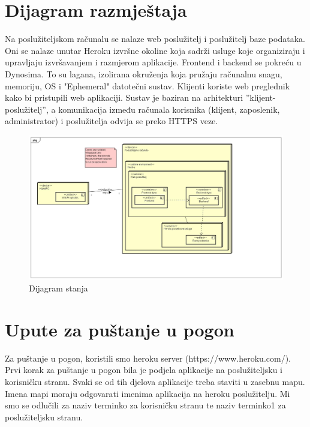 		
		\section{Dijagram razmještaja}
			Na poslužiteljskom računalu se nalaze web poslužitelj i poslužitelj baze podataka. Oni se nalaze unutar Heroku izvršne okoline koja sadrži usluge koje organiziraju i upravljaju izvršavanjem i razmjerom aplikacije. Frontend i backend se pokreću u Dynosima. To su lagana, izolirana okruženja koja pružaju računalnu snagu, memoriju, OS i "Ephemeral" datotečni sustav. Klijenti koriste web preglednik kako bi pristupili web aplikaciji.  Sustav je baziran na arhitekturi ”klijent-poslužitelj”, a komunikacija između računala korisnika (klijent, zaposlenik, administrator) i poslužitelja odvija se preko HTTPS veze.
			
			\begin{figure}[H]
				\includegraphics[width=1\linewidth]{slike/dijagram-razmjestaja.jpg}
				\centering
				\caption{Dijagram stanja}
				\label{fig:dijagram_razmjestaja}
			\end{figure}
			\eject 
		
		\section{Upute za puštanje u pogon}
		
			Za puštanje u pogon, koristili smo heroku server (https://www.heroku.com/). Prvi korak za puštanje u pogon bila je podjela aplikacije na poslužiteljsku i korisničku stranu. Svaki se od tih djelova aplikacije treba staviti u zasebnu mapu. Imena mapi moraju odgovarati imenima aplikacija na heroku poslužitelju. Mi smo se odlučili za naziv terminko za korisničku stranu te naziv terminko1 za poslužiteljsku stranu.
			

